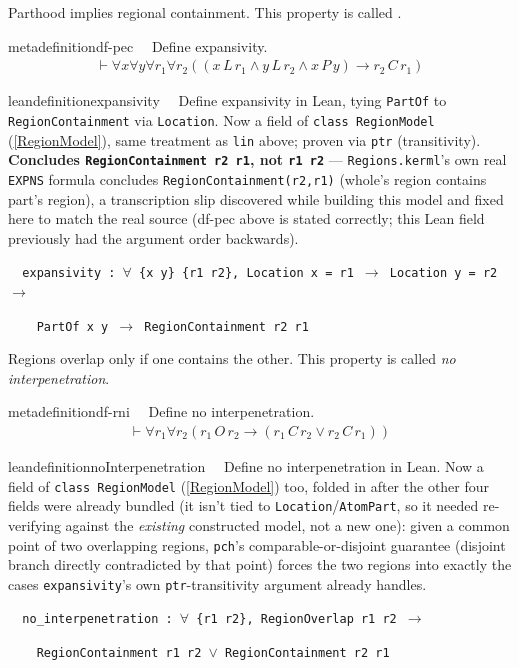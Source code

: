 \pn Parthood implies regional containment.  This property is called .
\begin{restatable}{metadefinition}{df-pec}~~ Define expansivity.
\begin{align}
\vdash \forall x \forall y \forall r_1 \forall r_2 ( ( x \,L \,r_1 \wedge y \,L
    \,r_2 \wedge x \,P \,y ) \rightarrow r_2 \,C \,r_1
    )\label{eq:df-pec}\tag{df-pec}
\end{align}
\end{restatable}

\begin{restatable}{leandefinition}{expansivity}~~ Define expansivity in Lean, tying
\texttt{PartOf} to \texttt{RegionContainment} via \texttt{Location}. Now a field of
\texttt{class RegionModel} (\ref{RegionModel}), same treatment as \texttt{lin} above; proven via
\texttt{ptr} (transitivity). \textbf{Concludes \texttt{RegionContainment r2 r1}, not \texttt{r1 r2}} ---
\texttt{Regions.kerml}'s own real \texttt{EXPNS} formula concludes \texttt{RegionContainment(r2,r1)}
(whole's region contains part's region), a transcription slip discovered while building this model and
fixed here to match the real source (df-pec above is stated correctly; this Lean field previously had the
argument order backwards).

\texttt{~~expansivity : $\forall$ \{x y\} \{r1 r2\}, Location x = r1 $\to$ Location y = r2 $\to$}

\texttt{~~~~PartOf x y $\to$ RegionContainment r2 r1}
\label{expansivity}
\end{restatable}

\pn Regions overlap only if one contains the other.  This property is called \emph{no} \emph{interpenetration}.
\begin{restatable}{metadefinition}{df-rni}~~ Define no interpenetration.
\begin{align}
\vdash \forall r_1 \forall r_2 ( r_1 \,O \,r_2 \rightarrow ( r_1 \,C \,r_2 \vee
    r_2 \,C \,r_1 ) )\label{eq:df-rni}\tag{df-rni}
\end{align}
\end{restatable}

\begin{restatable}{leandefinition}{noInterpenetration}~~ Define no
interpenetration in Lean. Now a field of \texttt{class RegionModel} (\ref{RegionModel}) too, folded in after
the other four fields were already bundled (it isn't tied to \texttt{Location}/\texttt{AtomPart}, so it
needed re-verifying against the \emph{existing} constructed model, not a new one): given a common point of
two overlapping regions, \texttt{pch}'s comparable-or-disjoint guarantee (disjoint branch directly
contradicted by that point) forces the two regions into exactly the cases \texttt{expansivity}'s own
\texttt{ptr}-transitivity argument already handles.

\texttt{~~no\_interpenetration : $\forall$ \{r1 r2\}, RegionOverlap r1 r2 $\to$}

\texttt{~~~~RegionContainment r1 r2 $\vee$ RegionContainment r2 r1}
\label{no_interpenetration}
\end{restatable}

